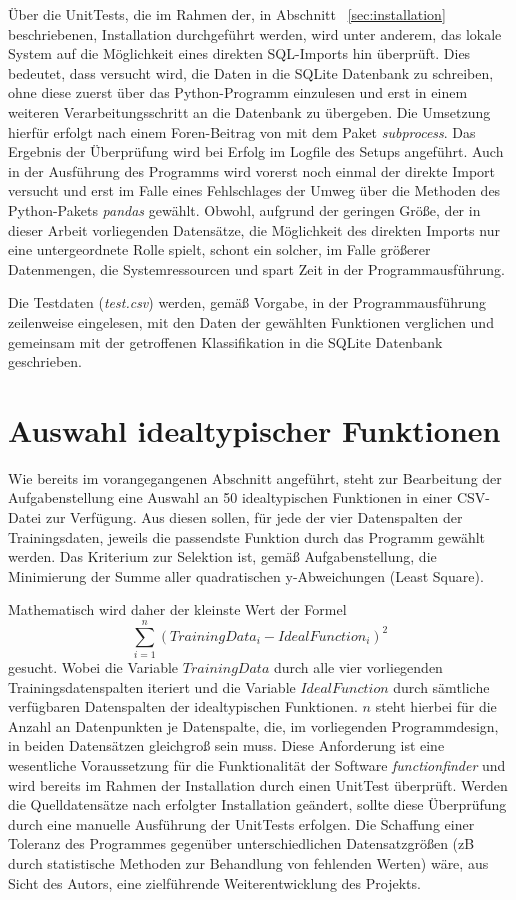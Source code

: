 Über die UnitTests, die im Rahmen der, in Abschnitt ~\ref{sec:installation} beschriebenen, Installation durchgeführt werden, wird unter anderem, das lokale System auf die Möglichkeit eines direkten SQL-Imports hin überprüft. Dies bedeutet, dass versucht wird, die Daten in die SQLite Datenbank zu schreiben, ohne diese zuerst über das Python-Programm einzulesen und erst in einem weiteren Verarbeitungsschritt an die Datenbank zu übergeben. Die Umsetzung hierfür erfolgt nach einem Foren-Beitrag von \cite{stevens-haas_importing_2021} mit dem Paket \emph{subprocess}. Das Ergebnis der Überprüfung wird bei Erfolg im Logfile des Setups angeführt. Auch in der Ausführung des Programms wird vorerst noch einmal der direkte Import versucht und erst im Falle eines Fehlschlages der Umweg über die Methoden des Python-Pakets \emph{pandas} gewählt. Obwohl, aufgrund der geringen Größe, der in dieser Arbeit vorliegenden Datensätze, die Möglichkeit des direkten Imports nur eine untergeordnete Rolle spielt, schont ein solcher, im Falle größerer Datenmengen, die Systemressourcen und spart Zeit in der Programmausführung.

Die Testdaten (\emph{test.csv}) werden, gemäß Vorgabe, in der Programmausführung zeilenweise eingelesen, mit den Daten der gewählten Funktionen verglichen und gemeinsam mit der getroffenen Klassifikation in die SQLite Datenbank geschrieben.


\section{Auswahl idealtypischer Funktionen}

Wie bereits im vorangegangenen Abschnitt angeführt, steht zur Bearbeitung der Aufgabenstellung eine Auswahl an 50 idealtypischen Funktionen in einer CSV-Datei zur Verfügung. Aus diesen sollen, für jede der vier Datenspalten der Trainingsdaten, jeweils die passendste Funktion durch das Programm gewählt werden. Das Kriterium zur Selektion ist, gemäß Aufgabenstellung, die Minimierung der Summe aller quadratischen y-Abweichungen (Least Square).

Mathematisch wird daher der kleinste Wert der Formel
\begin{equation}  
\sum_{i=1}^{n}(TrainingData_{i} - IdealFunction_{i})^2
\label{leastsquare}
\end{equation}
gesucht. Wobei die Variable $TrainingData$ durch alle vier vorliegenden Trainingsdatenspalten iteriert und die Variable $IdealFunction$ durch sämtliche verfügbaren Datenspalten der idealtypischen Funktionen. $n$ steht hierbei für die Anzahl an Datenpunkten je Datenspalte, die, im vorliegenden Programmdesign, in beiden Datensätzen gleichgroß sein muss. Diese Anforderung ist eine wesentliche Voraussetzung für die Funktionalität der Software \emph{functionfinder} und wird bereits im Rahmen der Installation durch einen UnitTest überprüft. Werden die Quelldatensätze nach erfolgter Installation geändert, sollte diese Überprüfung durch eine manuelle Ausführung der UnitTests erfolgen. Die Schaffung einer Toleranz des Programmes gegenüber unterschiedlichen Datensatzgrößen (zB durch statistische Methoden zur Behandlung von fehlenden Werten) wäre, aus Sicht des Autors, eine zielführende Weiterentwicklung des Projekts.

